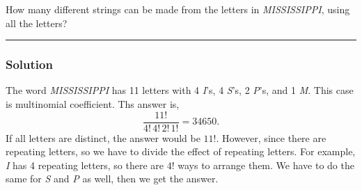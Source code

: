 \newpage
\begin{question}
How many different strings can be made from the letters in \textit{MISSISSIPPI}, using all the letters?
\end{question}

\par\noindent\rule{\textwidth}{0.5pt}

\subsubsection*{Solution}

The word \textit{MISSISSIPPI} has 11 letters with 4 \textit{I}'s, 4 \textit{S}'s, 2 \textit{P}'s, and 1 \textit{M}. This case is multinomial coefficient. Ths answer is, $$\frac{11!}{4!\,4!\,2!\,1!} = 34650.$$ If all letters are distinct, the answer would be $11!$. However, since there are repeating letters, so we have to divide the effect of repeating letters. For example, \textit{I} has 4 repeating letters, so there are $4!$ ways to arrange them. We have to do the same for \textit{S} and \textit{P} as well, then we get the answer.